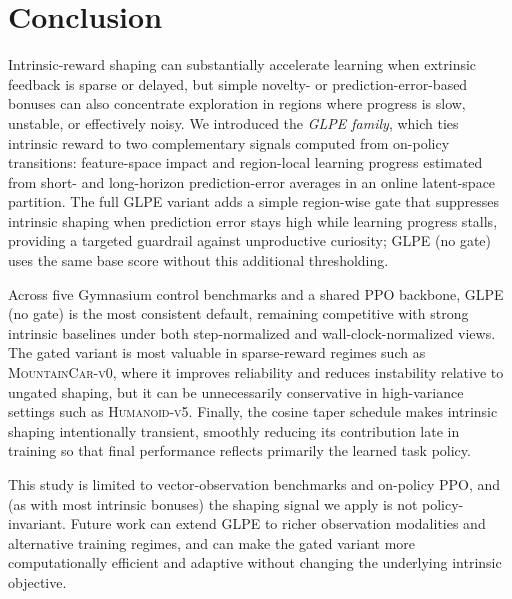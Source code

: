\section{Conclusion}
\label{sec:conclusion}

Intrinsic-reward shaping can substantially accelerate learning when extrinsic feedback is sparse or delayed, but simple novelty- or prediction-error-based bonuses can also concentrate exploration in regions where progress is slow, unstable, or effectively noisy.
We introduced the \emph{GLPE family}, which ties intrinsic reward to two complementary signals computed from on-policy transitions: feature-space impact and region-local learning progress estimated from short- and long-horizon prediction-error averages in an online latent-space partition.
The full GLPE variant adds a simple region-wise gate that suppresses intrinsic shaping when prediction error stays high while learning progress stalls, providing a targeted guardrail against unproductive curiosity; GLPE (no gate) uses the same base score without this additional thresholding.

Across five Gymnasium control benchmarks and a shared PPO backbone, GLPE (no gate) is the most consistent default, remaining competitive with strong intrinsic baselines under both step-normalized and wall-clock-normalized views.
The gated variant is most valuable in sparse-reward regimes such as \textsc{MountainCar-v0}, where it improves reliability and reduces instability relative to ungated shaping, but it can be unnecessarily conservative in high-variance settings such as \textsc{Humanoid-v5}.
Finally, the cosine taper schedule makes intrinsic shaping intentionally transient, smoothly reducing its contribution late in training so that final performance reflects primarily the learned task policy.

This study is limited to vector-observation benchmarks and on-policy PPO, and (as with most intrinsic bonuses) the shaping signal we apply is not policy-invariant.
Future work can extend GLPE to richer observation modalities and alternative training regimes, and can make the gated variant more computationally efficient and adaptive without changing the underlying intrinsic objective.
